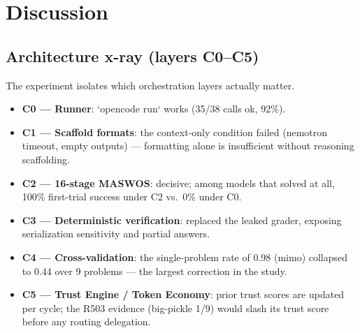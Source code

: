 \section{Discussion}
\label{sec:discussion}

\subsection{Architecture x-ray (layers C0--C5)}
\label{sec:xray}
The experiment isolates which orchestration layers actually matter.
\begin{itemize}
  \item \textbf{C0 --- Runner}: `opencode run` works (35/38 calls ok, 92\%).
  \item \textbf{C1 --- Scaffold formats}: the context-only condition failed
  (nemotron timeout, empty outputs) --- formatting alone is insufficient
  without reasoning scaffolding.
  \item \textbf{C2 --- 16-stage MASWOS}: decisive; among models that solved
  at all, 100\% first-trial success under C2 vs.\ 0\% under C0.
  \item \textbf{C3 --- Deterministic verification}: replaced the leaked
  grader, exposing serialization sensitivity and partial answers.
  \item \textbf{C4 --- Cross-validation}: the single-problem rate of 0.98
  (mimo) collapsed to 0.44 over 9 problems --- the largest correction in
  the study.
  \item \textbf{C5 --- Trust Engine / Token Economy}: prior trust scores are
  updated per cycle; the R503 evidence (big-pickle 1/9) would slash its
  trust score before any routing delegation.
\end{itemize}


